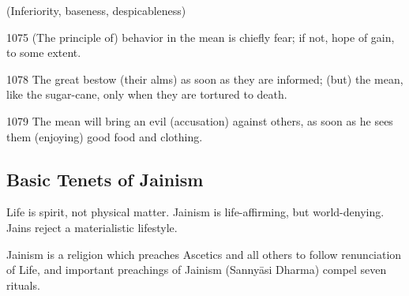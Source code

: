  (Inferiority, baseness, despicableness)

1075 (The principle of) behavior in the mean is chiefly fear; if not, hope of gain, to some extent. 

1078 The great bestow (their alms) as soon as they are informed; (but) the mean, like the sugar-cane, only when they are tortured to death. 

1079 The mean will bring an evil (accusation) against others, as soon as he sees them (enjoying) good food and clothing.


\subsection*{Basic Tenets of Jainism}

Life is spirit, not physical matter. Jainism is life-affirming, but world-denying. Jains reject a materialistic lifestyle.

Jainism is a religion which preaches Ascetics and all others to follow renunciation of Life, and important preachings of Jainism (Sannyāsi Dharma) compel seven rituals.

